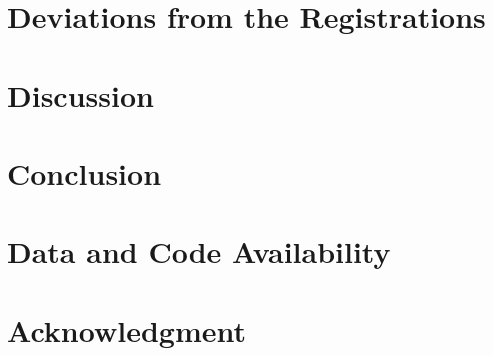 \documentclass[journal]{IEEEtran}
\begin{document}




\section{Deviations from the Registrations}\label{sec:deviations}



\section{Discussion}\label{sec:discussion}

\section{Conclusion}\label{sec:conclusion}

\section*{Data and Code Availability}

\section*{Acknowledgment}



\end{document}
